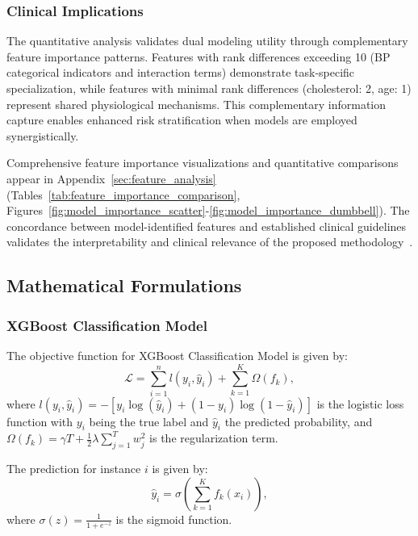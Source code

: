 \documentclass[conference]{IEEEtran}
\begin{document}
\subsubsection{Clinical Implications} 
The quantitative analysis validates dual modeling utility through complementary feature importance patterns. Features with rank differences exceeding 10 (BP categorical indicators and interaction terms) demonstrate task-specific specialization, while features with minimal rank differences (cholesterol: 2, age: 1) represent shared physiological mechanisms. This complementary information capture enables enhanced risk stratification when models are employed synergistically.

Comprehensive feature importance visualizations and quantitative comparisons appear in Appendix~\ref{sec:feature_analysis} (Tables~\ref{tab:feature_importance_comparison}, Figures~\ref{fig:model_importance_scatter}-\ref{fig:model_importance_dumbbell}). The concordance between model-identified features and established clinical guidelines validates the interpretability and clinical relevance of the proposed methodology~\cite{whelton2017acc,goff2014acc}.

\FloatBarrier



\newpage


\appendix

\subsection{Mathematical Formulations}
\label{sec:xgboost_formulas}

\subsubsection{XGBoost Classification Model}
\label{sec:xgboost_classification}
The objective function for XGBoost Classification Model is given by:
\begin{equation}\label{eq:XGBoostClassObjective}
\mathcal{L} = \sum_{i=1}^{n} l(y_i, \hat{y}_i) + \sum_{k=1}^{K} \Omega(f_k),
\end{equation}
where $l(y_i, \hat{y}_i)=-[y_i \log(\hat{y}_i) + (1-y_i) \log(1-\hat{y}_i)]$ is the logistic loss function with $y_i$ being the true label and $\hat{y}_i$ the predicted probability, and $\Omega(f_k) = \gamma T + \frac{1}{2}\lambda \sum_{j=1}^{T} w_j^2$ is the regularization term.

The prediction for instance $i$ is given by:
\begin{equation}
\hat{y}_i = \sigma\left(\sum_{k=1}^{K} f_k(x_i)\right),
\end{equation}
where $\sigma(z) = \frac{1}{1 + e^{-z}}$ is the sigmoid function.
\end{document}
